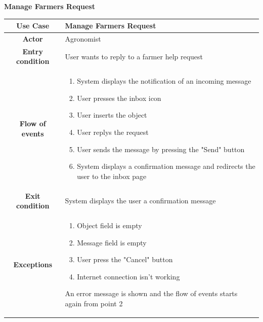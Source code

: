 \documentclass[table, 12pt]{article}
\begin{document}
\begin{itemize}
            \begin{table}[H]
                \item[] \textbf{Manage Farmers Request}
                \item[] 
                \centering
                \begin{tabular}{|c| m{}|}
                    \hline
                    \textbf{Use Case} & Manage Farmers Request\\ \hline
                    \textbf{Actor} & Agronomist\\ \hline
                    \textbf{Entry condition} & User wants to reply to a farmer help request\\  \hline
                    \textbf{Flow of events} & \begin{enumerate}
                                                \item System displays the notification of an incoming message
                                                \item User presses the inbox icon
                                                \item User inserts the object
                                                \item User replys the request
                                                \item User sends the message by pressing the "Send" button
                                                \item System displays a confirmation message and redirects the user to the inbox page
                                            \end{enumerate}\\ \hline
                    \textbf{Exit condition} & System displays the user a confirmation message\\ \hline
                    \textbf{Exceptions} &  \begin{enumerate}
                        \item Object field is empty
                        \item Message field is empty 
                        \item User press the "Cancel" button
                        \item Internet connection isn't working   
                    \end{enumerate}
                    An error message is shown and the flow of events starts again from point 2\\ \hline                    
                \end{tabular}
            \end{table}


\end{itemize}
\end{document}
